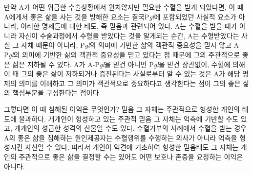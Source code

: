 만약 A가 어떤 위급한 수술상황에서 원치않지만 필요한 수혈을 받게 되었다면, 이 때 A에게서 좋은 삶을 사는 것을 방해한 요소는 결국P\emph{gl}에 포함되었던 사실적 요소가 아니라, 이러한 명제들에 대한 태도, 즉 믿음과 관련되어 있다. A는 수혈을 받을 때가 아니라 자신이 수술과정에서 수혈을 받았다는 것을 알게되는 순간, A는 수혈받았다는 사실 그 자체 때문이 아니라, P\emph{gl}의 의미에 기반한 삶의 객관적 중요성을 믿지 않고 A-P\emph{gl}의 의미에 기반한 삶의 객관적 중요성을 믿고 있다는 점 때문에 그의 주관적으로 좋은 삶은 저하될 수 있다. A가 A-P\emph{gl}을 믿건 아니면 P\emph{gl}을 믿건 상관없이, 수혈에 의해 이 때 그의 좋은 삶이 저하되거나 증진된다는 사실로부터 알 수 있는 것은 A가 해당 명제의 의미를 이해하고 그 의미가 객관적으로 중요하다고 생각한다는 점이 그의 좋은 삶의 핵심부분을 구성한다는 점이다.

그렇다면 이 때 침해된 이익은 무엇인가? 믿음 그 자체는 주관적으로 형성한 개인의 태도에 불과하다. 개개인이 형성하고 있는 주관적 믿음 그 자체는 억측에 기반할 수도 있고, 개개인의 성급한 성격의 산물일 수도 있다. 수혈거부의 사례에서 수혈을 받는 경우 A의 좋은 삶을 침해하는 원인제공자는 수혈행위를 수행하는 의사가 아니라 억측을 형성시킨 자신일 수 있다. 따라서 개인이 억견에 기초하여 형성한 믿음태도 그 자체는 개인의 주관적으로 좋은 삶을 결정할 수는 있어도 어떤 보호나 존중을 요청하는 이익은 아니다.


